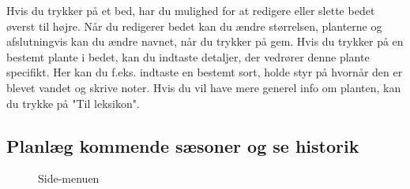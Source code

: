 \begin{minipage}{0.5\textwidth}
Hvis du trykker på et bed, har du mulighed for at redigere eller slette bedet øverst til højre. Når du redigerer bedet kan du ændre størrelsen, planterne og afslutningvis kan du ændre navnet, når du trykker på gem. Hvis du trykker på en bestemt plante i bedet, kan du indtaste detaljer, der vedrører denne plante specifikt. Her kan du f.eks. indtaste en bestemt sort, holde styr på hvornår den er blevet vandet og skrive noter. Hvis du vil have mere generel info om planten, kan du trykke på "Til leksikon".
\end{minipage}

\subsection{Planlæg kommende sæsoner og se historik}
\begin{minipage}{0.4\textwidth}
\begin{figure}[H]
    \centering
    \caption{Side-menuen}
\end{figure}
\end{minipage} \hfill
